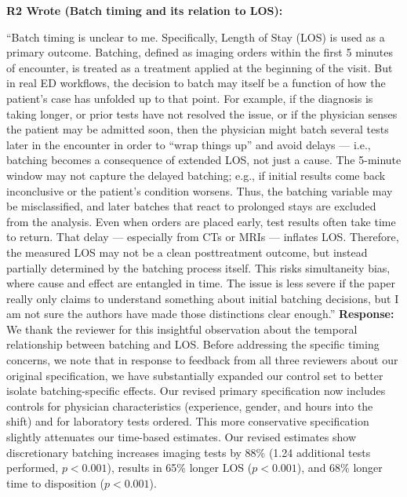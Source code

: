 \documentclass[11pt]{article}
\newenvironment{quote2}
{ \bigskip
\noindent
         \small\em
         \baselineskip=14pt
}
\newcommand{\1}{\hbox{\rm 1\kern-.35em 1}}
\begin{document}
\begin{quote2}
\textbf{R2 Wrote (Batch timing and its relation to LOS):}

\noindent``Batch timing is unclear to me. Specifically, Length of Stay (LOS) is used as a primary outcome. Batching, defined as imaging orders within the first 5 minutes of encounter, is treated as a treatment applied at the beginning of the visit. But in real ED workflows, the decision to batch may itself be a function of how the patient’s case has unfolded up to that point. For example, if the diagnosis is taking longer, or prior tests have not resolved the issue, or if the physician senses the patient may be admitted soon, then the physician might batch several tests later in the encounter in order to ``wrap things up'' and avoid delays — i.e., batching becomes a consequence of extended LOS, not just a cause. The 5-minute window may not capture the delayed batching; e.g., if initial results come back inconclusive or the patient’s condition worsens. Thus, the batching variable may be misclassified, and later batches that react to prolonged stays are excluded from the analysis. Even when orders are placed early, test results often take time to return. That delay — especially from CTs or MRIs — inflates LOS. Therefore, the measured LOS may not be a clean posttreatment outcome, but instead partially determined by the batching process itself. This risks simultaneity bias, where cause and effect are entangled in time. The issue is less severe if the paper really only claims to understand something about initial batching decisions, but I am not sure the authors have made those distinctions clear enough.'' 
\end{quote2}

\noindent\textbf{Response:} \color{blue}We thank the reviewer for this insightful observation about the temporal relationship between batching and LOS. Before addressing the specific timing concerns, we note that in response to feedback from all three reviewers about our original specification, we have substantially expanded our control set to better isolate batching-specific effects. Our revised primary specification now includes controls for physician characteristics (experience, gender, and hours into the shift) and for laboratory tests ordered. This more conservative specification slightly attenuates our time-based estimates. Our revised estimates show discretionary batching increases imaging tests by 88\% (1.24 additional tests performed, $p<0.001$), results in 65\% longer LOS ($p<0.001$), and 68\% longer time to disposition ($p<0.001$).
\end{document}

